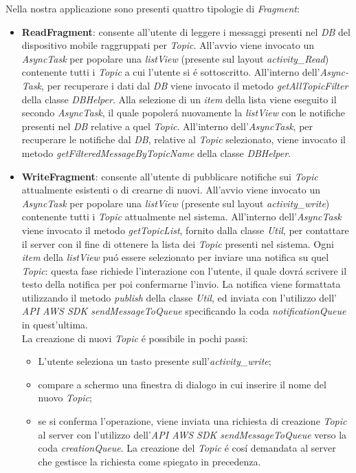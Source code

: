 \documentclass{article}
\begin{document}
Nella nostra applicazione sono presenti quattro tipologie di \textit{Fragment}:
\begin{itemize}
\item \textbf{ReadFragment}: consente all'utente di leggere i messaggi presenti nel \textit{DB} del dispositivo mobile raggruppati per \textit{Topic}. All'avvio viene invocato un \textit{AsyncTask} per popolare una \textit{listView} (presente sul layout \textit{activity\_Read}) contenente tutti i \textit{Topic} a cui l'utente si \'e sottoscritto. All'interno dell'\textit{Async-Task}, per recuperare i dati dal \textit{DB} viene invocato il metodo \textit{getAllTopicFilter} della classe \textit{DBHelper}.
Alla selezione di un \textit{item} della lista viene eseguito il secondo \textit{AsyncTask}, il quale popoler\'a nuovamente la \textit{listView} con le notifiche presenti nel \textit{DB} relative a quel \textit{Topic}.
All'interno dell'\textit{AsyncTask}, per recuperare le notifiche dal \textit{DB}, relative al \textit{Topic} selezionato, viene invocato il metodo \textit{getFilteredMessageByTopicName} della classe \textit{DBHelper}.
\item \textbf{WriteFragment}: consente all'utente di pubblicare notifiche sui \textit{Topic} attualmente esistenti o di crearne di nuovi. All'avvio viene invocato un \textit{AsyncTask} per popolare una \textit{listView} (presente sul layout \textit{activity\_write}) contenente tutti i \textit{Topic} attualmente nel sistema. All'interno dell'\textit{AsyncTask} viene invocato il metodo \textit{getTopicList}, fornito dalla classe \textit{Util}, per contattare il server con il fine di ottenere la lista dei \textit{Topic} presenti nel sistema. Ogni \textit{item} della \textit{listView} pu\'o essere selezionato per inviare una notifica su quel \textit{Topic}: questa fase richiede l'interazione con l'utente, il quale dovr\'a scrivere il testo della notifica per poi confermarne l'invio. La notifica viene formattata utilizzando il metodo \textit{publish} della classe \textit{Util}, ed inviata con l'utilizzo dell' \textit{API AWS SDK sendMessageToQueue} specificando la coda \textit{notificationQueue} in quest'ultima. 
\\La creazione di nuovi \textit{Topic} \'e possibile in pochi passi:
\begin{itemize}
\item	L'utente seleziona un tasto presente sull'\textit{activity\_write};
\item	compare a schermo una finestra di dialogo in cui inserire il nome del nuovo \textit{Topic};
\item 	se si conferma l'operazione, viene inviata una richiesta di creazione \textit{Topic} al server con l'utilizzo dell'\textit{API AWS SDK sendMessageToQueue} verso la coda \textit{creationQueue}. La creazione del \textit{Topic} \'e cos\'i 		demandata al server che gestisce la richiesta come spiegato in precedenza.
\end{itemize}


\end{itemize}
\end{document}
